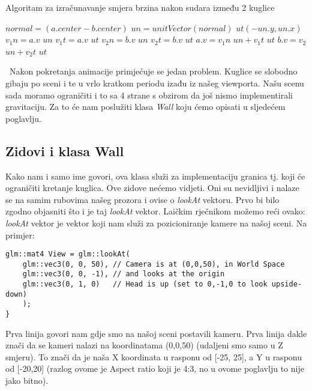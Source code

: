 \newpage
\begin{algorithm}
	\caption{Algoritam za izračunavanje smjera brzina nakon sudara između 2 kuglice}
	\label{alg:resolve_collision_1}
	\begin{algorithmic}
			\Return
			\EndIf
			\State $normal = (a.center - b.center)$
			\State $un = unitVector(normal)$
			\State $ut(-un.y,un.x)$
			\State $v_{1}n = a.v$  $un$
			\State $v_{1}t = a.v$ $ut$
			\State $v_{2}n = b.v$ $un$
			\State $v_{2}t = b.v$ $ut$
			\State $a.v = v_{1}n$ $un + v_{1}t$ $ut$
			\State $b.v = v_{2}$ $un + v_{2}t$ $ut$
		\EndFunction
	\end{algorithmic}
\end{algorithm}\
Nakon pokretanja animacije primjećuje se jedan problem. Kuglice se slobodno gibaju po sceni i te u vrlo kratkom periodu izađu iz našeg viewporta. Našu scenu sada moramo ograničiti i to sa 4 strane s obzirom da još nismo implementirali gravitaciju. Za to će nam poslužiti klasa \emph{Wall} koju ćemo opisati u sljedećem poglavlju.

\subsection{Zidovi i klasa Wall}
Kako nam i samo ime govori, ova klasa služi za implementaciju granica tj. koji će ograničiti kretanje kuglica. Ove zidove nećemo vidjeti. Oni su nevidljivi i nalaze se na samim rubovima našeg prozora i ovise o \emph{lookAt} vektoru. Prvo bi bilo zgodno objasniti što i je taj \emph{lookAt} vektor. Laičkim rječnikom  možemo reći ovako: \emph{lookAt} vektor je vektor koji nam služi za pozicioniranje kamere na našoj sceni. Na primjer:\newpage
\begin{lstlisting}[style=myC++, label = {code:10}, caption={Primjer lookAt vektora iz glm knjižnice}]
glm::mat4 View = glm::lookAt(
	glm::vec3(0, 0, 50), // Camera is at (0,0,50), in World Space
	glm::vec3(0, 0, -1), // and looks at the origin
	glm::vec3(0, 1, 0)   // Head is up (set to 0,-1,0 to look upside-down)
	);
}
\end{lstlisting}
Prva linija govori nam gdje smo na našoj sceni postavili kameru. Prva linija dakle znači da se kameri nalazi na koordinatama (0,0,50) (udaljeni smo samo u Z smjeru). To znači da je naša X koordinata u rasponu od [-25, 25], a Y u rasponu od [-20,20] (razlog ovome je Aspect ratio koji je 4:3, no u ovome poglavlju to nije jako bitno).


